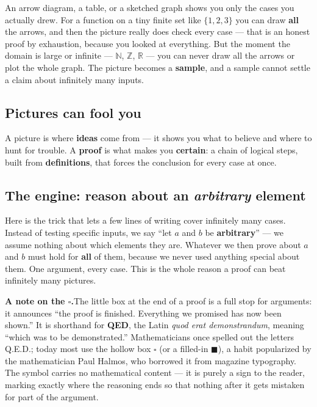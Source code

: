 \documentclass[12pt]{article}
\begin{document}
An arrow diagram, a table, or a sketched graph shows you only the cases you actually drew. For a function on a tiny finite set like $\{1,2,3\}$ you can draw \textbf{all} the arrows, and then the picture really does check every case --- that is an honest proof by exhaustion, because you looked at everything. But the moment the domain is large or infinite --- $\mathbb{N}$, $\mathbb{Z}$, $\mathbb{R}$ --- you can never draw all the arrows or plot the whole graph. The picture becomes a \textbf{sample}, and a sample cannot settle a claim about infinitely many inputs.

\subsection*{Pictures can fool you}

A picture is where \textbf{ideas} come from --- it shows you what to believe and where to hunt for trouble. A \textbf{proof} is what makes you \textbf{certain}: a chain of logical steps, built from \textbf{definitions}, that forces the conclusion for every case at once.

\subsection*{The engine: reason about an \emph{arbitrary} element}
Here is the trick that lets a few lines of writing cover infinitely many cases. Instead of testing specific inputs, we say ``let $a$ and $b$ be \textbf{arbitrary}'' --- we assume nothing about which elements they are. Whatever we then prove about $a$ and $b$ must hold for \textbf{all} of them, because we never used anything special about them. One argument, every case. This is the whole reason a proof can beat infinitely many pictures.

\textbf{A note on the $\square$.}\quad The little box at the end of a proof is a full stop for arguments: it announces ``the proof is finished. Everything we promised has now been shown.'' It is shorthand for \textbf{QED}, the Latin \textit{quod erat demonstrandum}, meaning ``which was to be demonstrated.'' Mathematicians once spelled out the letters Q.E.D.; today most use the hollow box $\square$ (or a filled-in $\blacksquare$), a habit popularized by the mathematician Paul Halmos, who borrowed it from magazine typography. The symbol carries no mathematical content --- it is purely a sign to the reader, marking exactly where the reasoning ends so that nothing after it gets mistaken for part of the argument.
\end{document}
